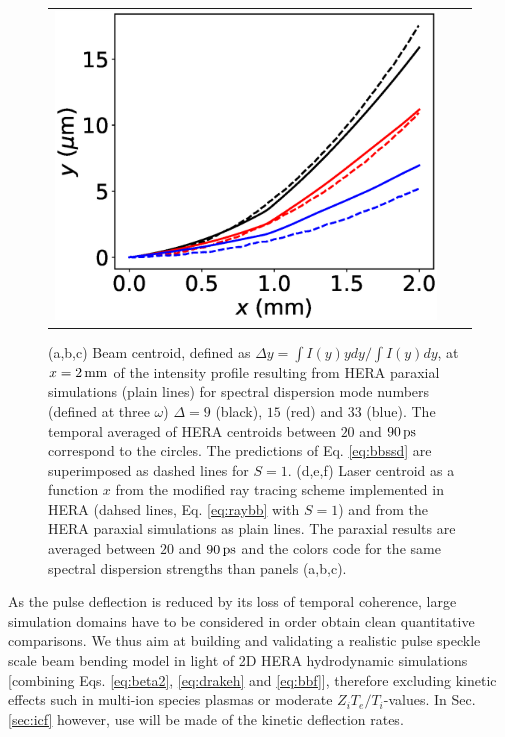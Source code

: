 \documentclass[%
 reprint,
 amsmath,amssymb,
 aps,
]{revtex4-1}
\begin{document}
\begin{figure}
\begin{tabular}{ccc}
\includegraphics[scale=0.32]{rayparaxHe.eps}
\end{tabular}
\caption{ \label{fig:ssd} 
(a,b,c) Beam centroid, defined as $\Delta y =\int I(y)y dy/\int I(y) dy$, at $x=2\,\rm mm$ of the intensity profile resulting from HERA paraxial simulations (plain lines) for spectral dispersion mode numbers (defined at three $\omega$)
$\Delta =9$ (black), $15$ (red) and $33$ (blue). The temporal averaged of HERA centroids between $20$ and $90\,\rm ps$ correspond to the circles. 
The predictions of Eq. \eqref{eq:bbssd} are superimposed as dashed lines for $S=1$.
(d,e,f) Laser centroid as a function $x$ from the modified ray tracing scheme implemented in HERA (dahsed lines, Eq. \eqref{eq:raybb} with $S=1$) and from the HERA paraxial simulations as plain lines. The paraxial results are averaged between $20$ and $90\,\rm ps$ and the colors code for the same spectral dispersion strengths than panels (a,b,c).
}
\end{figure}
As the pulse deflection is reduced by its loss of temporal coherence,  large simulation domains have to be considered in order obtain clean quantitative comparisons.
We thus aim  at building and validating a realistic pulse speckle scale beam bending model   in light of 2D HERA hydrodynamic simulations \cite[]{Loiseau_2006} [combining Eqs. \eqref{eq:beta2}, \eqref{eq:drakeh} and \eqref{eq:bbf}], therefore excluding kinetic effects such in multi-ion species plasmas or moderate $Z_iT_e/T_i$-values. In Sec. \ref{sec:icf} however, use will be made of the kinetic deflection rates.
\end{document}
